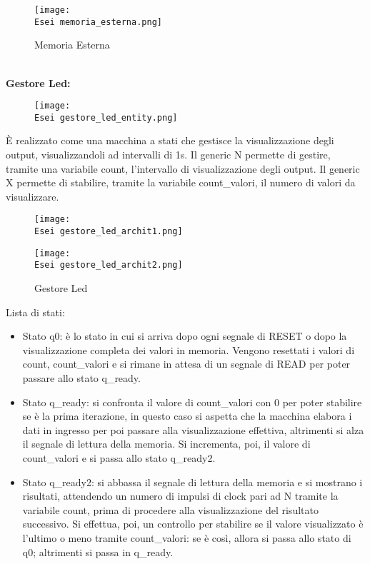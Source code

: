 \documentclass[12pt]{article}
\def \Esei {Allegati/Esercizio6/}
\begin{document}
\begin{figure}[ht!]
    \centering
    \texttt{[image: \\Esei memoria\_esterna.png]}
    \caption{Memoria Esterna}
\end{figure}
\\{\large \textbf{Gestore Led:}}
\begin{figure}[ht!]
    \centering
    \texttt{[image: \\Esei gestore\_led\_entity.png]}
\end{figure}
\clearpage
È realizzato come una macchina a stati che gestisce la visualizzazione degli output, visualizzandoli ad intervalli di 1s. Il generic N permette di gestire, tramite una variabile count, l’intervallo di visualizzazione degli output. Il generic X permette di stabilire, tramite la variabile count\_valori, il numero di valori da visualizzare.
\begin{figure}[ht!]
    \texttt{[image: \\Esei gestore\_led\_archit1.png]}
\end{figure}
\begin{figure}[ht!]
    \texttt{[image: \\Esei gestore\_led\_archit2.png]}
    \caption{Gestore Led}
\end{figure}
\clearpage
Lista di stati:
\begin{itemize}
    \item Stato q0: è lo stato in cui si arriva dopo ogni segnale di RESET o dopo la visualizzazione completa dei valori in memoria. Vengono resettati i valori di count, count\_valori e si rimane in attesa di un segnale di READ per poter passare allo stato q\_ready.
    \item Stato q\_ready: si confronta il valore di count\_valori con 0 per poter stabilire se è la prima iterazione, in questo caso si aspetta che la macchina elabora i dati in ingresso per poi passare alla visualizzazione effettiva, altrimenti si alza il segnale di lettura della memoria. Si incrementa, poi, il valore di count\_valori e si passa allo stato q\_ready2.
    \item Stato q\_ready2: si abbassa il segnale di lettura della memoria e si mostrano i risultati, attendendo un numero di impulsi di clock pari ad N tramite la variabile count, prima di procedere alla visualizzazione del risultato successivo. Si effettua, poi, un controllo per stabilire se il valore visualizzato è l’ultimo o meno tramite count\_valori: se è così, allora si passa allo stato di q0;  altrimenti si passa in q\_ready.
\end{itemize}
\end{document}
